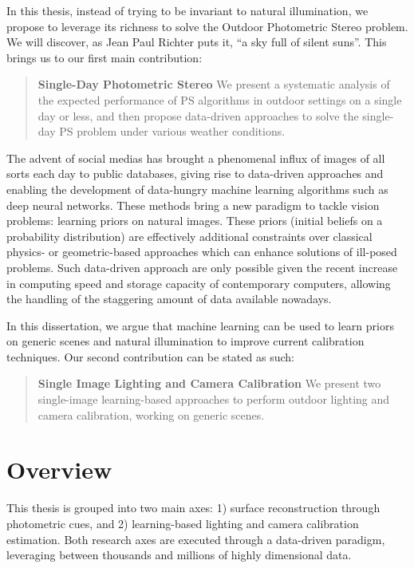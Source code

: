In this thesis, instead of trying to be invariant to natural illumination, we propose to leverage its richness to solve the Outdoor Photometric Stereo problem. We will discover, as Jean Paul Richter puts it, ``a sky full of silent suns''. This brings us to our first main contribution:
\begin{quotation}
\textbf{Single-Day Photometric Stereo} We present a systematic analysis of the expected performance of PS algorithms in outdoor settings on a single day or less, and then propose data-driven approaches to solve the single-day PS problem under various weather conditions.
\end{quotation}

The advent of social medias has brought a phenomenal influx of images of all sorts each day to public databases, giving rise to data-driven approaches and enabling the development of data-hungry machine learning algorithms such as deep neural networks. These methods bring a new paradigm to tackle vision problems: learning priors on natural images. These priors (initial beliefs on a probability distribution) are effectively additional constraints over classical physics- or geometric-based approaches which can enhance solutions of ill-posed problems. Such data-driven approach are only possible given the recent increase in computing speed and storage capacity of contemporary computers, allowing the handling of the staggering amount of data available nowadays.

In this dissertation, we argue that machine learning can be used to learn priors on generic scenes and natural illumination to improve current calibration techniques. Our second contribution can be stated as such:
\begin{quotation}
\textbf{Single Image Lighting and Camera Calibration} We present two single-image learning-based approaches to perform outdoor lighting and camera calibration, working on generic scenes.
\end{quotation}


\section*{Overview}

This thesis is grouped into two main axes: 1) surface reconstruction through photometric cues, and 2) learning-based lighting and camera calibration estimation. Both research axes are executed through a data-driven paradigm, leveraging between thousands and millions of highly dimensional data.

